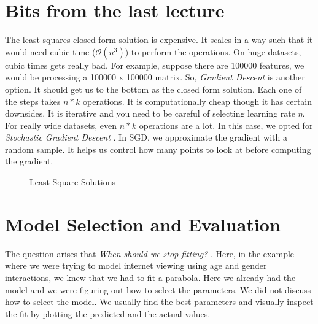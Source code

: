 
\section{Bits from the last lecture}
The least squares closed form solution is expensive. It scales in a way such that it would need cubic time ($\mathcal{O}(n^3)$) to perform the operations. 
On huge datasets, cubic times gets really bad. For example, suppose there are 100000 features, we would be processing a 100000 x 100000 matrix.
So, \emph {Gradient Descent} is another option. It should get us to the bottom as the closed form solution. Each one of the steps takes $n*k$ operations. It is computationally
cheap though it has certain downsides. It is iterative and you need to be careful of selecting learning rate $\eta$. For really wide datasets, even $n*k$ operations are a lot. In this case,
we opted for \emph {Stochastic Gradient Descent }. In SGD, we approximate the gradient with a random sample. It helps us control how many points to look at before computing the gradient. 


\begin{figure}[h]
\centering
\caption{Least Square Solutions}
{\setlength{\fboxsep}{20pt}
\setlength{\fboxrule}{1pt}
\textcolor{DarkBlue}{}
}
\end{figure} 

\section { Model Selection and Evaluation}
The question arises that \emph{When should we stop fitting? }. Here, in the example where we were trying to model internet viewing using age and gender interactions,  we knew that we had to fit a parabola. 
Here we already had the model and we were figuring out how to select the parameters. We did not discuss how to select the model. We usually find the best parameters and visually inspect the fit by plotting the 
predicted and the actual values. 

